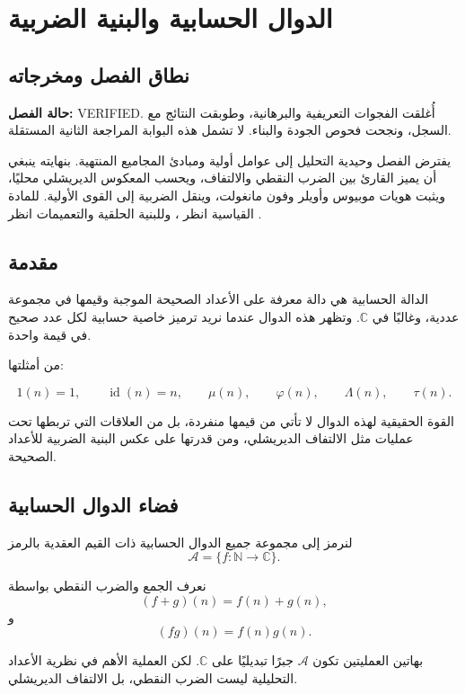 \chapter{الدوال الحسابية والبنية الضربية}

\section{نطاق الفصل ومخرجاته}

\noindent\textbf{حالة الفصل:} \textenglish{VERIFIED}. أُغلقت الفجوات
التعريفية والبرهانية، وطوبقت النتائج مع السجل، ونجحت فحوص الجودة والبناء.
لا تشمل هذه البوابة المراجعة الثانية المستقلة.

يفترض الفصل وحيدية التحليل إلى عوامل أولية ومبادئ المجاميع المنتهية.
بنهايته ينبغي أن يميز القارئ بين الضرب النقطي والالتفاف، ويحسب المعكوس
الديريشلي محليًا، ويثبت هويات موبيوس وأويلر وفون مانغولت، وينقل الضربية
إلى القوى الأولية. للمادة القياسية انظر \cite{Apostol1976}، وللبنية
الحلقية والتعميمات انظر \cite{Shapiro1972,Toth2013}.

\section{مقدمة}

الدالة الحسابية هي دالة معرفة على الأعداد الصحيحة الموجبة وقيمها في مجموعة عددية، وغالبًا في \(\mathbb{C}\). وتظهر هذه الدوال عندما نريد ترميز خاصية حسابية لكل عدد صحيح في قيمة واحدة.

من أمثلتها:

\[
1(n)=1,
\qquad
\operatorname{id}(n)=n,
\qquad
\mu(n),
\qquad
\varphi(n),
\qquad
\Lambda(n),
\qquad
\tau(n).
\]

القوة الحقيقية لهذه الدوال لا تأتي من قيمها منفردة، بل من العلاقات التي تربطها تحت عمليات مثل الالتفاف الديريشلي، ومن قدرتها على عكس البنية الضربية للأعداد الصحيحة.

\section{فضاء الدوال الحسابية}

لنرمز إلى مجموعة جميع الدوال الحسابية ذات القيم العقدية بالرمز
\[
\mathcal{A}
=
\{f:\mathbb{N}\to\mathbb{C}\}.
\]

نعرف الجمع والضرب النقطي بواسطة
\[
(f+g)(n)=f(n)+g(n),
\]
و
\[
(fg)(n)=f(n)g(n).
\]

بهاتين العمليتين تكون \(\mathcal{A}\) جبرًا تبديليًا على \(\mathbb{C}\). لكن العملية الأهم في نظرية الأعداد التحليلية ليست الضرب النقطي، بل الالتفاف الديريشلي.

